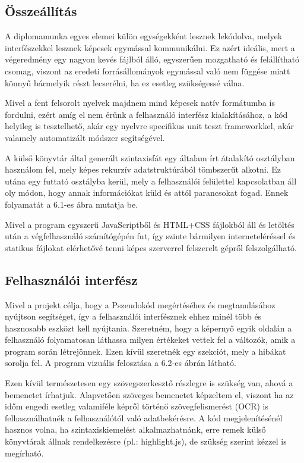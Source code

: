 \subsection{Összeállítás}

A diplomamunka egyes elemei külön egységekként lesznek lekódolva, melyek interfészekkel lesznek képesek egymással kommunikálni. Ez azért ideális, mert a végeredmény egy nagyon kevés fájlból álló, egyszerűen mozgatható és felállítható csomag, viszont az eredeti forrásállományok egymással való nem függése miatt könnyű bármelyik részt lecserélni, ha ez esetleg szükségessé válna.

Mivel a fent felsorolt nyelvek majdnem mind képesek natív formátumba is fordulni, ezért amíg el nem érünk a felhasználó interfész kialakításához, a kód helyileg is tesztelhető, akár egy nyelvre specifikus unit teszt frameworkkel, akár valamely automatizált módszer segítségével.

A külső könyvtár által generált szintaxisfát egy általam írt átalakító osztályban használom fel, mely képes rekurzív adatstruktúrából tömbszerűt alkotni. Ez utána egy futtató osztályba kerül, mely a felhasználói felülettel kapcsolatban áll oly módon, hogy annak információkat küld és attól parancsokat fogad. Ennek folyamatát a 6.1-es ábra mutatja be.

Mivel a program egyszerű JavaScriptből és HTML+CSS fájlokból áll és letöltés után a végfelhasználó számítógépén fut, így szinte bármilyen interneteléréssel és statikus fájlokat elérhetővé tenni képes szerverrel felszerelt gépről felszolgálható.

\subsection{Felhasználói interfész}

Mivel a projekt célja, hogy a Pszeudokód megértéséhez és megtanulásához nyújtson segítséget, így a felhasználói interfésznek ehhez minél több és hasznosabb eszközt kell nyújtania. Szeretném, hogy a képernyő egyik oldalán a felhasználó folyamatosan láthassa milyen értékeket vettek fel a változók, amik a program során létrejönnek. Ezen kívül szeretnék egy szekciót, mely a hibákat sorolja fel. A program vizuális felosztása a 6.2-es ábrán látható.

Ezen kívül természetesen egy szövegszerkesztő részlegre is szükség van, ahová a bemenetet írhatjuk. Alapvetően szöveges bemenetet képzeltem el, viszont ha az időm engedi esetleg valamiféle képről történő szövegfelismerést (OCR) is felhasználhatnék a felhasználótól való adatbekérésre. A kód megjelenítésénél hasznos volna, ha szintaxiskiemelést alkalmazhatnánk, erre remek külső könyvtárak állnak rendelkezésre (pl.: highlight.js), de szükség szerint kézzel is megírható.

